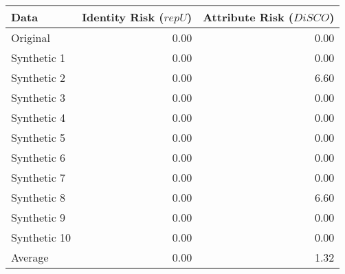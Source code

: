 \begin{tabular}{lrr}
  \toprule
Data & Identity Risk ($repU$) & Attribute Risk ($DiSCO$) \\ 
  \midrule
Original & 0.00 & 0.00 \\ 
  Synthetic 1 & 0.00 & 0.00 \\ 
  Synthetic 2 & 0.00 & 6.60 \\ 
  Synthetic 3 & 0.00 & 0.00 \\ 
  Synthetic 4 & 0.00 & 0.00 \\ 
  Synthetic 5 & 0.00 & 0.00 \\ 
  Synthetic 6 & 0.00 & 0.00 \\ 
  Synthetic 7 & 0.00 & 0.00 \\ 
  Synthetic 8 & 0.00 & 6.60 \\ 
  Synthetic 9 & 0.00 & 0.00 \\ 
  Synthetic 10 & 0.00 & 0.00 \\ 
  Average & 0.00 & 1.32 \\ 
   \bottomrule
\end{tabular}
